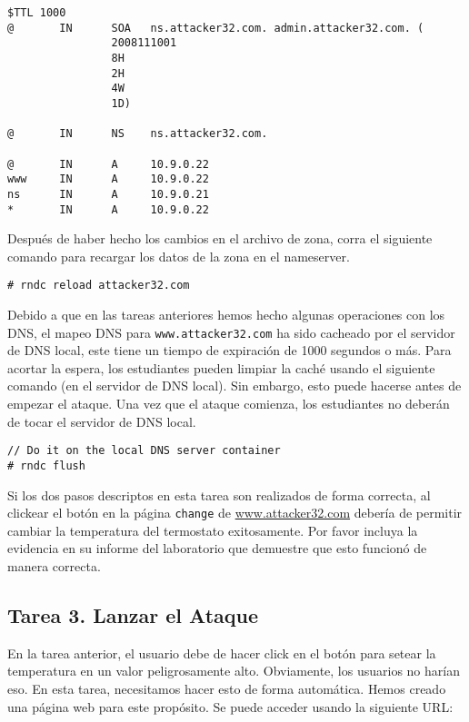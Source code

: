 \begin{lstlisting}
$TTL 1000
@       IN      SOA   ns.attacker32.com. admin.attacker32.com. (
                2008111001
                8H
                2H
                4W
                1D)

@       IN      NS    ns.attacker32.com.

@       IN      A     10.9.0.22
www     IN      A     10.9.0.22
ns      IN      A     10.9.0.21
*       IN      A     10.9.0.22
\end{lstlisting}

Después de haber hecho los cambios en el archivo de zona, corra el siguiente comando para recargar los datos de la zona en el nameserver.

\begin{lstlisting}
# rndc reload attacker32.com
\end{lstlisting}

Debido a que en las tareas anteriores hemos hecho algunas operaciones con los DNS, el mapeo DNS para \texttt{www.attacker32.com} ha sido cacheado por el servidor de DNS local, este tiene un tiempo de expiración de 1000 segundos o más. Para acortar la espera, los estudiantes pueden limpiar la caché usando el siguiente comando (en el servidor de DNS local). Sin embargo, esto puede hacerse antes de empezar el ataque. Una vez que el ataque comienza, los estudiantes no deberán de tocar el servidor de DNS local.


\begin{lstlisting}
// Do it on the local DNS server container
# rndc flush
\end{lstlisting}
 
Si los dos pasos descriptos en esta tarea son realizados de forma correcta, al clickear el botón en la página \texttt{change} de  \url{www.attacker32.com} debería de permitir cambiar la temperatura del termostato exitosamente. Por favor incluya la evidencia en su informe del laboratorio que demuestre que esto funcionó de manera correcta.

\subsection{Tarea 3. Lanzar el Ataque}

En la tarea anterior, el usuario debe de hacer click en el botón para setear la temperatura en un valor peligrosamente alto. Obviamente, los usuarios no harían eso. En esta tarea, necesitamos hacer esto de forma automática. Hemos creado una página web para este propósito. Se puede acceder usando la siguiente URL:


